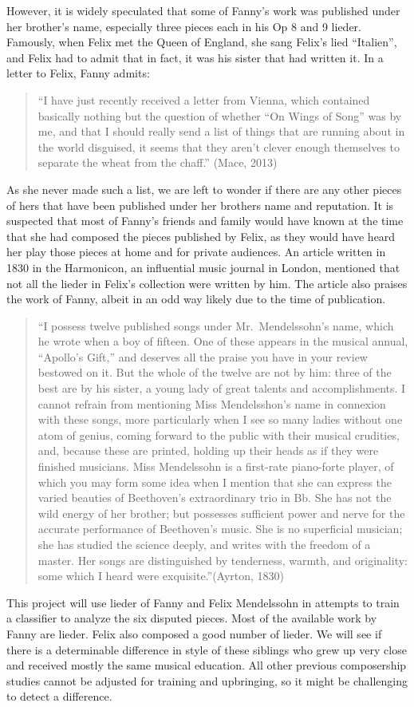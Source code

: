 \documentclass[12pt,twoside]{reedthesis}
\theoremstyle{definition}
\theoremstyle{definition}
\theoremstyle{definition}
\theoremstyle{remark}
\begin{document}
However, it is widely speculated that some of Fanny's work was published
under her brother's name, especially three pieces each in his Op 8 and 9
lieder. Famously, when Felix met the Queen of England, she sang Felix's
lied ``Italien'', and Felix had to admit that in fact, it was his sister
that had written it. In a letter to Felix, Fanny admits:
\begin{quote}
``I have just recently received a letter from Vienna, which contained
basically nothing but the question of whether ``On Wings of Song'' was
by me, and that I should really send a list of things that are running
about in the world disguised, it seems that they aren't clever enough
themselves to separate the wheat from the chaff.'' (Mace, 2013)
\end{quote}
As she never made such a list, we are left to wonder if there are any
other pieces of hers that have been published under her brothers name
and reputation. It is suspected that most of Fanny's friends and family
would have known at the time that she had composed the pieces published
by Felix, as they would have heard her play those pieces at home and for
private audiences. An article written in 1830 in the Harmonicon, an
influential music journal in London, mentioned that not all the lieder
in Felix's collection were written by him. The article also praises the
work of Fanny, albeit in an odd way likely due to the time of
publication.
\begin{quote}
``I possess twelve published songs under Mr.~Mendelssohn's name, which
he wrote when a boy of fifteen. One of these appears in the musical
annual, ``Apollo's Gift,'' and deserves all the praise you have in your
review bestowed on it. But the whole of the twelve are not by him: three
of the best are by his sister, a young lady of great talents and
accomplishments. I cannot refrain from mentioning Miss Mendelsshon's
name in connexion with these songs, more particularly when I see so many
ladies without one atom of genius, coming forward to the public with
their musical crudities, and, because these are printed, holding up
their heads as if they were finished musicians. Miss Mendelssohn is a
first-rate piano-forte player, of which you may form some idea when I
mention that she can express the varied beauties of Beethoven's
extraordinary trio in Bb. She has not the wild energy of her brother;
but possesses sufficient power and nerve for the accurate performance of
Beethoven's music. She is no superficial musician; she has studied the
science deeply, and writes with the freedom of a master. Her songs are
distinguished by tenderness, warmth, and originality: some which I heard
were exquisite.''(Ayrton, 1830)
\end{quote}
This project will use lieder of Fanny and Felix Mendelssohn in attempts
to train a classifier to analyze the six disputed pieces. Most of the
available work by Fanny are lieder. Felix also composed a good number of
lieder. We will see if there is a determinable difference in style of
these siblings who grew up very close and received mostly the same
musical education. All other previous composership studies cannot be
adjusted for training and upbringing, so it might be challenging to
detect a difference.
\end{document}
